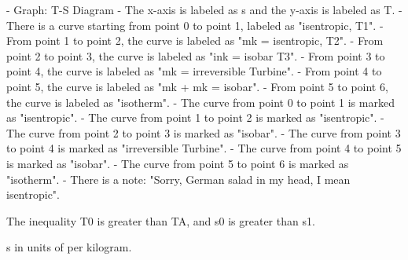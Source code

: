- Graph: T-S Diagram
- The x-axis is labeled as s and the y-axis is labeled as T.
- There is a curve starting from point 0 to point 1, labeled as "isentropic, T1".
- From point 1 to point 2, the curve is labeled as "mk = isentropic, T2".
- From point 2 to point 3, the curve is labeled as "ink = isobar T3".
- From point 3 to point 4, the curve is labeled as "mk = irreversible Turbine".
- From point 4 to point 5, the curve is labeled as "mk + mk = isobar".
- From point 5 to point 6, the curve is labeled as "isotherm".
- The curve from point 0 to point 1 is marked as "isentropic".
- The curve from point 1 to point 2 is marked as "isentropic".
- The curve from point 2 to point 3 is marked as "isobar".
- The curve from point 3 to point 4 is marked as "irreversible Turbine".
- The curve from point 4 to point 5 is marked as "isobar".
- The curve from point 5 to point 6 is marked as "isotherm".
- There is a note: "Sorry, German salad in my head, I mean isentropic".

The inequality T0 is greater than TA, and s0 is greater than s1.

s in units of per kilogram.